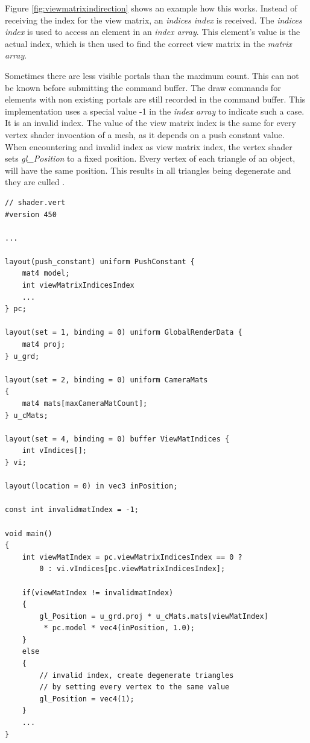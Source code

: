 Figure \ref{fig:viewmatrixindirection} shows an example how this works. Instead of receiving the index for the view matrix, an \textit{indices index} is received. The \textit{indices index} is used to access an element in an \textit{index array}. This element's value is the actual index, which is then used to find the correct view matrix in the \textit{matrix array}.

Sometimes there are less visible portals than the maximum count. This can not be known before submitting the command buffer. The draw commands for elements with non existing portals are still recorded in the command buffer. This implementation uses a special value -1 in the \textit{index array} to indicate such a case. It is an invalid index. The value of the view matrix index is the same for every vertex shader invocation of a mesh, as it depends on a push constant value. When encountering and invalid index as view matrix index, the vertex shader sets \textit{gl\_Position} to a fixed position. Every vertex of each triangle of an object, will have the same position. This results in all triangles being degenerate and they are culled \cite{khronos:vulkan:spec1.1}.

\begin{lstlisting}[caption={View Matrix Selection}, label=listing:viewmatrixselection]
// shader.vert
#version 450

...

layout(push_constant) uniform PushConstant {	
	mat4 model;
	int viewMatrixIndicesIndex
	...
} pc;

layout(set = 1, binding = 0) uniform GlobalRenderData {
	mat4 proj;
} u_grd;

layout(set = 2, binding = 0) uniform CameraMats
{
	mat4 mats[maxCameraMatCount];
} u_cMats;

layout(set = 4, binding = 0) buffer ViewMatIndices {
	int vIndices[];
} vi;

layout(location = 0) in vec3 inPosition;

const int invalidmatIndex = -1;

void main()
{
	int viewMatIndex = pc.viewMatrixIndicesIndex == 0 ? 
		0 : vi.vIndices[pc.viewMatrixIndicesIndex];
	
	if(viewMatIndex != invalidmatIndex)
	{
		gl_Position = u_grd.proj * u_cMats.mats[viewMatIndex]
		 * pc.model * vec4(inPosition, 1.0);
	}
	else
	{
		// invalid index, create degenerate triangles
		// by setting every vertex to the same value
		gl_Position = vec4(1);
	}
	...
}

\end{lstlisting}

